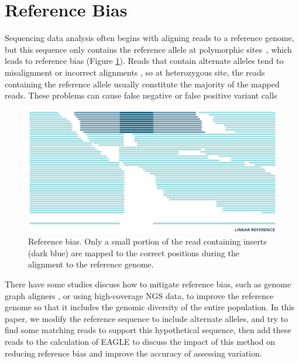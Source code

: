 \section{Reference Bias}
Sequencing data analysis often begins with aligning reads to a reference genome, but this sequence only contains the reference allele at polymorphic sites~\cite{martiniano2020removing}, which leads to reference bias (Figure \ref{reference_bias}).  Reads that contain alternate alleles tend to misalignment or incorrect alignments \cite{chen2021reference}, so at heterozygous site, the reads containing the reference allele usually constitute the majority of the mapped reads.  These problems can cause false negative or false positive variant calls~\cite{gunther2019presence}

\begin{figure}[H]
\includegraphics[width=1\columnwidth]{body/image/reference_bias.png}\vspace*{-1em}
\caption[Reference bias]{Reference bias. Only a small portion of the read containing inserts (dark blue) are mapped to the correct positions during the alignment to the reference genome. \cite{ReferenceBias}}
\label{reference_bias}
\end{figure}



There have some studies discuss how to mitigate reference bias, such as genome graph aligners \cite{garrison2018variation,li2020design}, or using high-coverage NGS data, to improve the reference genome so that it includes the genomic diversity of the entire population.
In this paper, we modify the reference sequence to include alternate alleles, and try to find some matching reads to support this hypothetical sequence, then add these reads to the calculation of EAGLE to discuss the impact of this method on reducing reference bias and improve the accuracy of assessing variation.
